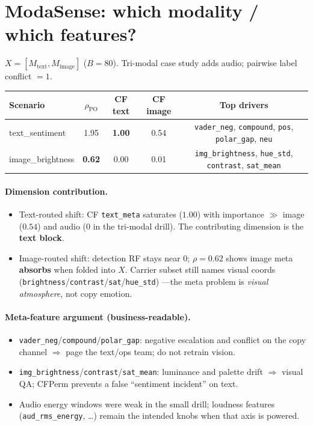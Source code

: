\documentclass[11pt]{article}
\begin{document}
\section{ModaSense: which modality / which features?}
$X=[M_{\mathrm{text}},M_{\mathrm{image}}]$ ($B{=}80$). Tri-modal case
study adds audio; pairwise label conflict $=1$.
\begin{center}
\begin{tabular}{lcccc}
\toprule
Scenario & $\rho_{\mathrm{PO}}$ & CF text & CF image & Top drivers \\
\midrule
text\_sentiment & 1.95 & \textbf{1.00} & 0.54 &
  \texttt{vader\_neg}, \texttt{compound}, \texttt{pos},
  \texttt{polar\_gap}, \texttt{neu} \\
image\_brightness & \textbf{0.62} & 0.00 & 0.01 &
  \texttt{img\_brightness}, \texttt{hue\_std},
  \texttt{contrast}, \texttt{sat\_mean} \\
\bottomrule
\end{tabular}
\end{center}

\paragraph{Dimension contribution.}
\begin{itemize}[leftmargin=*]
  \item Text-routed shift: CF \texttt{text\_meta} saturates ($1.00$) with
        importance $\gg$ image ($0.54$) and audio ($0$ in the tri-modal
        drill). The contributing dimension is the \textbf{text block}.
  \item Image-routed shift: detection RF stays near $0$; $\rho{=}0.62$
        shows image meta \textbf{absorbs} when folded into $X$. Carrier
        subset still names visual coords
        (\texttt{brightness}/\texttt{contrast}/\texttt{sat}/\texttt{hue\_std})
       ---the meta problem is \emph{visual atmosphere}, not copy emotion.
\end{itemize}

\paragraph{Meta-feature argument (business-readable).}
\begin{itemize}[leftmargin=*]
  \item \texttt{vader\_neg}/\texttt{compound}/\texttt{polar\_gap}:
        negative escalation and conflict on the copy channel $\Rightarrow$
        page the text/ops team; do not retrain vision.
  \item \texttt{img\_brightness}/\texttt{contrast}/\texttt{sat\_mean}:
        luminance and palette drift $\Rightarrow$ visual QA; CFPerm
        prevents a false ``sentiment incident'' on text.
  \item Audio energy windows were weak in the small drill; loudness
        features (\texttt{aud\_rms\_energy}, \ldots) remain the intended
        knobs when that axis is powered.
\end{itemize}
\end{document}
